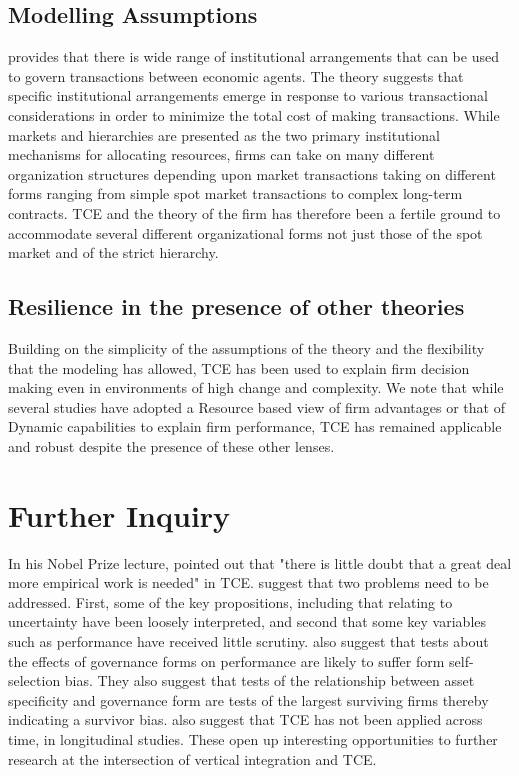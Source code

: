 \documentclass[12pt]{article}
\begin{document}
\subsection{Modelling Assumptions}
\cite{Williamson1975} provides that there is wide range of institutional arrangements that can be used to govern transactions between economic agents.  The theory suggests that specific institutional arrangements emerge in response to various transactional considerations in order to minimize the total cost of making transactions. While markets and hierarchies are presented as the two primary institutional mechanisms for allocating resources, firms can take on many different organization structures depending upon market transactions taking on different forms ranging from simple spot market transactions to complex long-term contracts. TCE and the theory of the firm has therefore been a fertile ground to accommodate several different organizational forms not just those of the spot market and of the strict hierarchy.

\subsection{Resilience in the presence of other theories}
Building on the simplicity of the assumptions of the theory and the flexibility that the modeling has allowed, TCE has been used to explain firm decision making even in environments of high change and complexity. We note that while several studies have adopted a Resource based view of firm advantages or that of Dynamic capabilities to explain firm performance, TCE has remained applicable and robust despite the presence of these other lenses.

\section{Further Inquiry}
In his Nobel Prize lecture, \cite{Coase1992} pointed out that "there is little doubt that a great deal more empirical work is needed" in TCE. \cite{David2004} suggest that two problems need to be addressed. First, some of the key propositions, including that relating to uncertainty have been loosely interpreted, and second that some key variables such as performance have received little scrutiny. \cite{David2004} also suggest that tests about the effects of governance forms on performance are likely to suffer form self-selection bias. They also suggest that tests of the relationship between asset specificity and governance form are tests of the largest surviving firms thereby indicating a survivor bias. \cite{David2004} also suggest that TCE has not been applied across time, in longitudinal studies. These open up interesting opportunities to further research at the intersection of vertical integration and TCE. 
\end{document}
